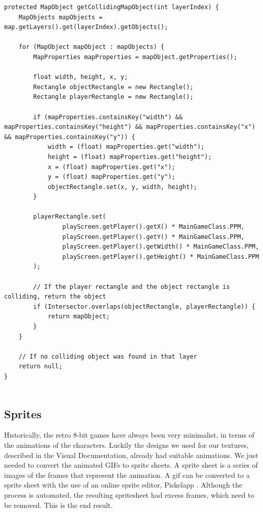 \documentclass[12p]{article}
\begin{document}
\begin{verbatim}
protected MapObject getCollidingMapObject(int layerIndex) {
    MapObjects mapObjects = map.getLayers().get(layerIndex).getObjects();

    for (MapObject mapObject : mapObjects) {
        MapProperties mapProperties = mapObject.getProperties();

        float width, height, x, y;
        Rectangle objectRectangle = new Rectangle();
        Rectangle playerRectangle = new Rectangle();

        if (mapProperties.containsKey("width") && mapProperties.containsKey("height") && mapProperties.containsKey("x") && mapProperties.containsKey("y")) {
            width = (float) mapProperties.get("width");
            height = (float) mapProperties.get("height");
            x = (float) mapProperties.get("x");
            y = (float) mapProperties.get("y");
            objectRectangle.set(x, y, width, height);
        }

        playerRectangle.set(
                playScreen.getPlayer().getX() * MainGameClass.PPM,
                playScreen.getPlayer().getY() * MainGameClass.PPM,
                playScreen.getPlayer().getWidth() * MainGameClass.PPM,
                playScreen.getPlayer().getHeight() * MainGameClass.PPM
        );

        // If the player rectangle and the object rectangle is colliding, return the object
        if (Intersector.overlaps(objectRectangle, playerRectangle)) {
            return mapObject;
        }
    }

    // If no colliding object was found in that layer
    return null;
}
   
\end{verbatim}


\newpage
\subsection{Sprites} \label{DocSprites}

Historically, the retro 8-bit games have always been very minimalist, in terms of the animations of the characters. Luckily the designs we used for our textures, described in the Visual Documentation, already had suitable animations. We just needed to convert the animated GIFs to sprite sheets. A sprite sheet is a series of images of the frames that represent the animation. A gif can be converted to a sprite sheet with the use of an online sprite editor, Piskelapp \cite{piskelapp}. Although the process is automated, the resulting spritesheet had excess frames, which need to be removed. This is the end result.
\end{document}
